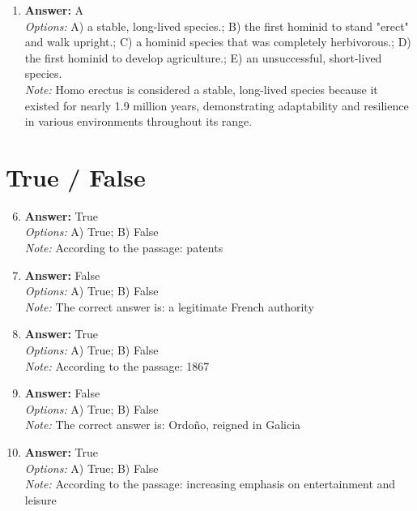 \documentclass[12pt]{article}
\begin{document}
\begin{enumerate}[label=\arabic*.]
\\ \textit{Note:} The correct answer is based on the distinction between primary refuse, which is typically found in an office setting where immediate waste is generated, and secondary refuse, which accumulates in a landfill as a result of long-term waste disposal practices.
\item \textbf{Answer:} A
\\ \textit{Options:} A) a stable, long-lived species.; B) the first hominid to stand "erect" and walk upright.; C) a hominid species that was completely herbivorous.; D) the first hominid to develop agriculture.; E) an unsuccessful, short-lived species.
\\ \textit{Note:} Homo erectus is considered a stable, long-lived species because it existed for nearly 1.9 million years, demonstrating adaptability and resilience in various environments throughout its range.
\end{enumerate}

\section*{True / False}
\begin{enumerate}[label=\arabic*.]
\setcounter{enumi}{5}
\item \textbf{Answer:} True
\\ \textit{Options:} A) True; B) False
\\ \textit{Note:} According to the passage: patents
\item \textbf{Answer:} False
\\ \textit{Options:} A) True; B) False
\\ \textit{Note:} The correct answer is: a legitimate French authority
\item \textbf{Answer:} True
\\ \textit{Options:} A) True; B) False
\\ \textit{Note:} According to the passage: 1867
\item \textbf{Answer:} False
\\ \textit{Options:} A) True; B) False
\\ \textit{Note:} The correct answer is: Ordoño, reigned in Galicia
\item \textbf{Answer:} True
\\ \textit{Options:} A) True; B) False
\\ \textit{Note:} According to the passage: increasing emphasis on entertainment and leisure
\end{enumerate}
\end{document}
